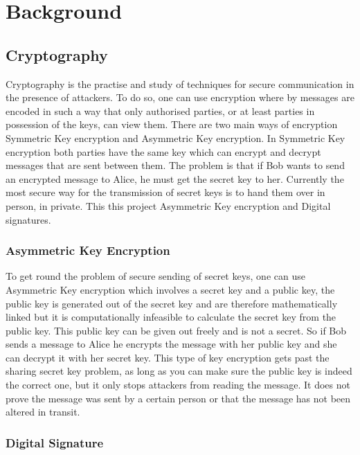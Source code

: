 
\chapter{Background}
\label{back}

\section{Cryptography}

Cryptography is the practise and study of techniques for secure communication in the presence of attackers. To do so, one can use encryption where by messages are encoded in such a way that only authorised parties, or at least parties in possession of the keys, can view them. There are two main ways of encryption Symmetric Key encryption and Asymmetric Key encryption. In Symmetric Key encryption both parties have the same key which can encrypt and decrypt messages that are sent between them. The problem is that if Bob wants to send an encrypted message to Alice, he must get the secret key to her. Currently the most secure way for the transmission of secret keys is to hand them over in person, in private. This this project Asymmetric Key encryption and Digital signatures.

\subsection{Asymmetric Key Encryption}

To get round the problem of secure sending of secret keys, one can use Asymmetric Key encryption which involves a secret key and a public key, the public key is generated out of the secret key and are therefore mathematically linked but it is computationally infeasible to calculate the secret key from the public key. This public key can be given out freely and is not a secret. So if Bob sends a message to Alice he encrypts the message with her public key and she can decrypt it with her secret key. This type of key encryption gets past the sharing secret key problem, as long as you can make sure the public key is indeed the correct one, but it only stops attackers from reading the message. It does not prove the message was sent by a certain person or that the message has not been altered in transit.

\subsection{Digital Signature}

